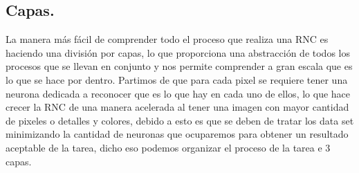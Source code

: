 \documentclass[a4paper, 12pt]{article}
\begin{document}
    \subsection{Capas.}
    La manera más fácil de comprender todo el proceso que realiza una RNC es haciendo una división por capas, lo que proporciona una abstracción de todos los procesos que se llevan en conjunto y nos permite comprender a gran escala que es lo que se hace por dentro. Partimos de que para cada pixel se requiere tener una neurona dedicada a reconocer que es lo que hay en cada uno de ellos, lo que hace crecer la RNC de una manera acelerada al tener una imagen con mayor cantidad de pixeles o detalles y colores, debido a esto es que se deben de tratar los data set minimizando la cantidad de neuronas que ocuparemos para obtener un resultado aceptable de la tarea, dicho eso podemos organizar el proceso de la tarea e 3 capas. 
\end{document}
